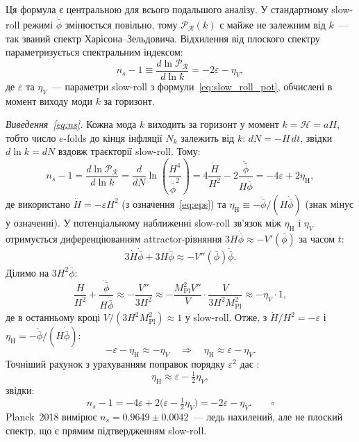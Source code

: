 Ця формула є центральною для всього подальшого аналізу. У
стандартному slow-roll режимі $\dot{\bar\phi}$ змінюється
повільно, тому $\mathcal{P}_{\mathcal{R}}(k)$ є майже не
залежним від $k$~--- так званий спектр Харісона--Зельдовича.
Відхилення від плоского спектру параметризується спектральним
індексом:
\begin{equation}\label{eq:ns}
  n_s - 1 \equiv \frac{d\ln\mathcal{P}_{\mathcal{R}}}{d\ln k}
            = -2\varepsilon - \eta_V,
\end{equation}
де $\varepsilon$ та $\eta_V$~--- параметри slow-roll з
формули~\eqref{eq:slow_roll_pot}, обчислені в момент виходу
моди $k$ за горизонт.

\textit{Виведення~\eqref{eq:ns}.}
Кожна мода $k$ виходить за горизонт у момент $k = \mathcal{H}
= aH$, тобто число $e$-folds до кінця інфляції $N_k$ залежить
від $k$: $dN = -H\,dt$, звідки $d\ln k = dN$ вздовж траєкторії
slow-roll. Тому:
\begin{equation*}
  n_s - 1
    = \frac{d\ln\mathcal{P}_{\mathcal{R}}}{d\ln k}
    = \frac{d}{dN}\ln\!\left(\frac{H^4}{\dot{\bar\phi}^2}\right)
    = 4\frac{\dot H}{H^2} - 2\frac{\ddot{\bar\phi}}{H\dot{\bar\phi}}
    = -4\varepsilon + 2\eta_\mathrm{H},
\end{equation*}
де використано $\dot H = -\varepsilon H^2$ (з означення~\eqref{eq:eps})
та $\eta_\mathrm{H} \equiv -\ddot{\bar\phi}/(H\dot{\bar\phi})$
(знак мінус у означенні).
У потенціальному наближенні slow-roll зв'язок між $\eta_\mathrm{H}$
і $\eta_V$ отримується диференціюванням attractor-рівняння
$3H\dot{\bar\phi} \approx -V'(\bar\phi)$ за часом $t$:
\begin{equation*}
  3\dot H\dot{\bar\phi} + 3H\ddot{\bar\phi} \approx -V''(\bar\phi)\dot{\bar\phi}.
\end{equation*}
Ділимо на $3H^2\dot{\bar\phi}$:
\begin{equation*}
  \frac{\dot H}{H^2} + \frac{\ddot{\bar\phi}}{H\dot{\bar\phi}}
  \approx -\frac{V''}{3H^2}
  \approx -\frac{M_\mathrm{Pl}^2 V''}{V} \cdot \frac{V}{3H^2 M_\mathrm{Pl}^2}
  \approx -\eta_V \cdot 1,
\end{equation*}
де в останньому кроці $V/(3H^2 M_\mathrm{Pl}^2) \approx 1$ у slow-roll.
Отже, з $\dot H/H^2 = -\varepsilon$ і $\eta_\mathrm{H} = -\ddot{\bar\phi}/(H\dot{\bar\phi})$:
\begin{equation*}
  -\varepsilon - \eta_\mathrm{H} \approx -\eta_V
  \quad\Rightarrow\quad
  \eta_\mathrm{H} \approx \varepsilon - \eta_V.
\end{equation*}
Точніший рахунок з урахуванням поправок порядку $\varepsilon^2$
дає \cite{mukhanov_2005}:
\[
  \eta_\mathrm{H} \approx \varepsilon - \tfrac{1}{2}\eta_V,
\]
звідки:
\begin{equation*}
  n_s - 1 = -4\varepsilon + 2\bigl(\varepsilon -
  \tfrac{1}{2}\eta_V\bigr) = -2\varepsilon - \eta_V. \qquad\square
\end{equation*}
Planck~2018 вимірює $n_s = 0.9649 \pm 0.0042$~--- ледь нахилений,
але не плоский спектр, що є прямим підтвердженням slow-roll.

